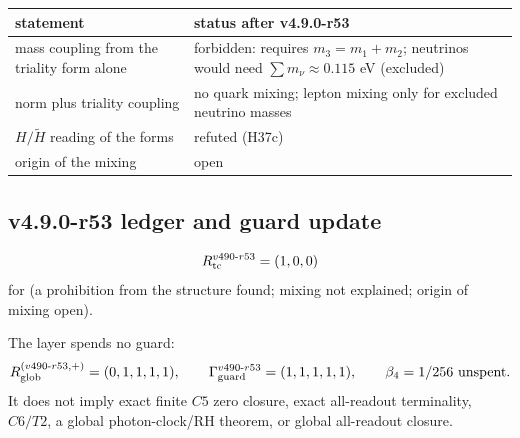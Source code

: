 \begin{center}
\small
\begin{tabular}{@{}>{\raggedright\arraybackslash}p{}>{\raggedright\arraybackslash}p{}@{}}
\toprule
statement & status after v4.9.0-r53\\
\midrule
mass coupling from the triality form alone & forbidden: requires \(m_3=m_1+m_2\); neutrinos would need \(\sum m_\nu\approx0.115\) eV (excluded)\\
norm plus triality coupling & no quark mixing; lepton mixing only for excluded neutrino masses\\
\(H/\tilde H\) reading of the forms & refuted (H37c)\\
origin of the mixing & open\\
\bottomrule
\end{tabular}
\end{center}

\subsection*{v4.9.0-r53 ledger and guard update}
\label{subsec:v490-r53-ledger-guard}

\[
R_{\rm tc}^{v490\text{-}r53}=(1,0,0)
\]
for (a prohibition from the structure found; mixing not explained; origin of mixing open).

The layer spends no guard:
\[
R_{\rm glob}^{(v490\text{-}r53,+)}=(0,1,1,1,1),
\qquad
\Gamma_{\rm guard}^{v490\text{-}r53}=(1,1,1,1,1),
\qquad
\beta_4=1/256\ \text{unspent}.
\]
It does not imply exact finite \(C5\) zero closure, exact all-readout terminality,
\(C6/T2\), a global photon-clock/RH theorem, or global all-readout closure.

